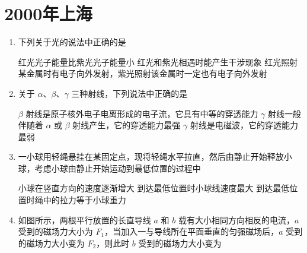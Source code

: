 \documentclass[\gkver]{gaokaozhenti}
\begin{document}
\chapter{2000年上海}

\begin{enumerate}
\item
下列关于光的说法中正确的是

{红光光子能量比紫光光子能量小}
{红光和紫光相遇时能产生干涉现象}
{红光照射某金属时有电子向外发射，紫光照射该金属时一定也有电子向外发射}


\item
关于 $\alpha$、$\beta$、$\gamma$ 三种射线，下列说法中正确的是

{$\beta$ 射线是原子核外电子电离形成的电子流，它具有中等的穿透能力}
{$\gamma$ 射线一般伴随着 $\alpha$ 或 $\beta$ 射线产生，它的穿透能力最强}
{$\gamma$ 射线是电磁波，它的穿透能力最弱}


\item
一小球用轻绳悬挂在某固定点，现将轻绳水平拉直，然后由静止开始释放小球，考虑小球由静止开始运动到最低位置的过程中

{小球在竖直方向的速度逐渐增大}
{到达最低位置时小球线速度最大}
{到达最低位置时绳中的拉力等于小球重力}


\item
如图所示，两根平行放置的长直导线 $a$ 和 $b$ 载有大小相同方向相反的电流，$a$ 受到的磁场力大小为 $F_{1}$，当加入一与导线所在平面垂直的匀强磁场后，$a$ 受到的磁场力大小变为 $F_{2}$，则此时 $b$ 受到的磁场力大小变为


\end{enumerate}
\end{document}
